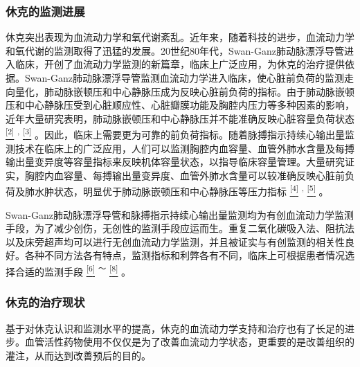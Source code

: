 \subsubsection{休克的监测进展}

休克突出表现为血流动力学和氧代谢紊乱。近年来，随着科技的进步，血流动力学和氧代谢的监测取得了迅猛的发展。20世纪80年代，Swan-Ganz肺动脉漂浮导管进入临床，开创了血流动力学监测的新篇章，临床上广泛应用，为休克的治疗提供依据。Swan-Ganz肺动脉漂浮导管监测血流动力学进入临床，使心脏前负荷的监测走向量化，肺动脉嵌顿压和中心静脉压成为反映心脏前负荷的指标。由于肺动脉嵌顿压和中心静脉压受到心脏顺应性、心脏瓣膜功能及胸腔内压力等多种因素的影响，近年大量研究表明，肺动脉嵌顿压和中心静脉压并不能准确反映心脏容量负荷状态
\protect\hyperlink{text00008.htmlux5cux23ch2-7}{\textsuperscript{{[}2{]}}}
\textsuperscript{,}
\protect\hyperlink{text00008.htmlux5cux23ch3-7}{\textsuperscript{{[}3{]}}}
。因此，临床上需要更为可靠的前负荷指标。随着脉搏指示持续心输出量监测技术在临床上的广泛应用，人们可以监测胸腔内血容量、血管外肺水含量及每搏输出量变异度等容量指标来反映机体容量状态，以指导临床容量管理。大量研究证实，胸腔内血容量、每搏输出量变异度、血管外肺水含量可以较准确反映心脏前负荷及肺水肿状态，明显优于肺动脉嵌顿压和中心静脉压等压力指标
\protect\hyperlink{text00008.htmlux5cux23ch4-7}{\textsuperscript{{[}4{]}}}
\textsuperscript{,}
\protect\hyperlink{text00008.htmlux5cux23ch5-7}{\textsuperscript{{[}5{]}}}
。

Swan-Ganz肺动脉漂浮导管和脉搏指示持续心输出量监测均为有创血流动力学监测手段，为了减少创伤，无创性的监测手段应运而生。重复二氧化碳吸入法、阻抗法以及床旁超声均可以进行无创血流动力学监测，并且被证实与有创监测的相关性良好。各种不同方法各有特点，监测指标和利弊各有不同，临床上可根据患者情况选择合适的监测手段
\protect\hyperlink{text00008.htmlux5cux23ch6-7}{\textsuperscript{{[}6{]}}}
\textsuperscript{～}
\protect\hyperlink{text00008.htmlux5cux23ch8-7}{\textsuperscript{{[}8{]}}}
。

\subsubsection{休克的治疗现状}

基于对休克认识和监测水平的提高，休克的血流动力学支持和治疗也有了长足的进步。血管活性药物使用不仅仅是为了改善血流动力学状态，更重要的是改善组织的灌注，从而达到改善预后的目的。

